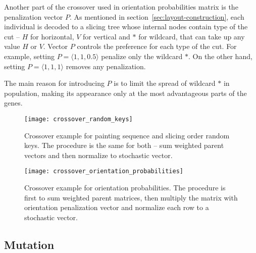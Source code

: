 Another part of the crossover used in orientation probabilities matrix is the penalization vector $P$.
As mentioned in section~\ref{sec:layout-construction}, each individual is decoded to a slicing tree
whose internal nodes contain type of the cut – $H$ for horizontal, $V$ for vertical
and $*$ for wildcard, that can take up any value $H$ or $V$.
Vector $P$ controls the preference for each type of the cut.
For example, setting $P= \langle 1,1,0.5 \rangle$ penalize only the wildcard $*$.
On the other hand, setting $P= \langle 1,1,1 \rangle$ removes any penalization.

The main reason for introducing $P$ is to limit the spread of wildcard $*$ in population,
making its appearance only at the most advantageous parts of the genes.



\begin{figure}[htp]
    \texttt{[image: crossover\_random\_keys]}\caption{
        Crossover example for painting sequence and slicing order random keys.
        The procedure is the same for both – sum weighted parent vectors and then normalize to stochastic vector.
    }
    \label{fig:crossover-random-keys}
\end{figure}

\begin{figure}[htp]
    \texttt{[image: crossover\_orientation\_probabilities]}\caption{
        Crossover example for orientation probabilities. The procedure is first to sum weighted parent matrices,
        then multiply the matrix with orientation penalization vector and normalize each row to a stochastic vector.}
    \label{fig:crossover-orientation-probabilities}
\end{figure}

\subsection{Mutation}\label{subsec:mutation}
